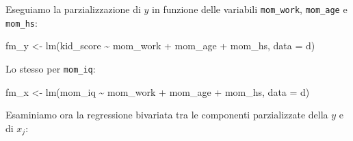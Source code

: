 \documentclass[
  11pt,
]{krantz}
\makeatletter
\newenvironment{Shaded}{\begin{snugshade}}{\end{snugshade}}
\newcommand{\AttributeTok}[1]{\textcolor[rgb]{0.61,0.61,0.61}{#1}}
\newcommand{\CommentTok}[1]{\textcolor[rgb]{0.37,0.37,0.37}{\textit{#1}}}
\newcommand{\FunctionTok}[1]{\textcolor[rgb]{0,0,0}{#1}}
\newcommand{\NormalTok}[1]{#1}
\newcommand{\OtherTok}[1]{\textcolor[rgb]{0.37,0.37,0.37}{#1}}
\newcommand{\SpecialCharTok}[1]{\textcolor[rgb]{0,0,0}{#1}}
\newenvironment{kframe}{%
\medskip{}
\setlength{\fboxsep}{.8em}
 \def\at@end@of@kframe{}%
 \ifinner\ifhmode%
  \def\at@end@of@kframe{\end{minipage}}%
  \begin{minipage}{\columnwidth}%
 \fi\fi%
 \def\FrameCommand##1{\hskip\@totalleftmargin \hskip-\fboxsep
 \colorbox{shadecolor}{##1}\hskip-\fboxsep
     \hskip-\linewidth \hskip-\@totalleftmargin \hskip\columnwidth}%
 \MakeFramed {\advance\hsize-\width
   \@totalleftmargin\z@ \linewidth\hsize
   \@setminipage}}%
 {\par\unskip\endMakeFramed%
 \at@end@of@kframe}
\renewenvironment{Shaded}{\begin{kframe}}{\end{kframe}}
\theoremstyle{definition}
\theoremstyle{definition}
\theoremstyle{definition}
\theoremstyle{definition}
\theoremstyle{remark}
\makeatother
\begin{document}
\begin{Shaded}
\end{Shaded}

Eseguiamo la parzializzazione di \(y\) in funzione delle variabili \texttt{mom\_work}, \texttt{mom\_age} e \texttt{mom\_hs}:

\begin{Shaded}
\begin{Highlighting}[]
\NormalTok{fm\_y }\OtherTok{\textless{}{-}} \FunctionTok{lm}\NormalTok{(kid\_score }\SpecialCharTok{\textasciitilde{}}\NormalTok{ mom\_work }\SpecialCharTok{+}\NormalTok{ mom\_age }\SpecialCharTok{+}\NormalTok{ mom\_hs, }\AttributeTok{data =}\NormalTok{ d)}
\end{Highlighting}
\end{Shaded}

Lo stesso per \texttt{mom\_iq}:

\begin{Shaded}
\begin{Highlighting}[]
\NormalTok{fm\_x }\OtherTok{\textless{}{-}} \FunctionTok{lm}\NormalTok{(mom\_iq }\SpecialCharTok{\textasciitilde{}}\NormalTok{ mom\_work }\SpecialCharTok{+}\NormalTok{ mom\_age }\SpecialCharTok{+}\NormalTok{ mom\_hs, }\AttributeTok{data =}\NormalTok{ d)}
\end{Highlighting}
\end{Shaded}

Esaminiamo ora la regressione bivariata tra le componenti parzializzate della \(y\) e di \(x_j\):

\begin{Shaded}
\end{Shaded}
\end{document}
